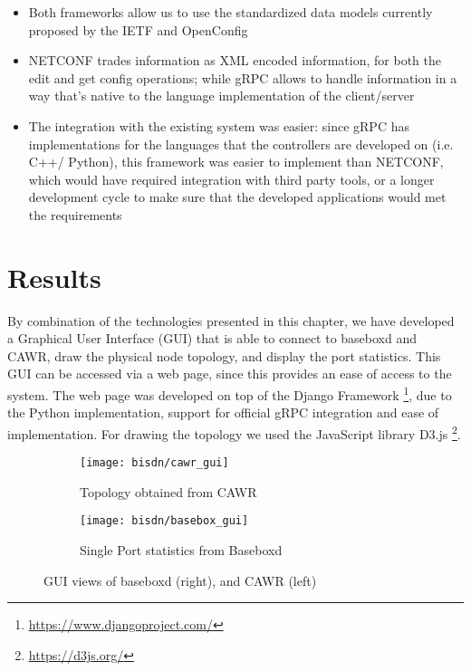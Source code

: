 \begin {itemize}
    \item Both frameworks allow us to use the standardized data models currently proposed by the IETF and OpenConfig
    \item NETCONF trades information as XML encoded information, for both the edit and get config operations; while gRPC allows to handle information in a way that’s native to the language implementation of the client/server
    \item The integration with the existing system was easier: since gRPC has implementations for the languages that the controllers are developed on (i.e. C++/ Python), this framework was easier to implement 
        than NETCONF, which would have required integration with third party tools, or a longer development cycle to make sure that the developed applications would met the requirements
\end {itemize}

\section {Results}

By combination of the technologies presented in this chapter, we have developed a Graphical User Interface (GUI) that is able to connect to baseboxd and CAWR, draw the physical node topology, and display the port statistics. 
This GUI can be accessed via a web page, since this provides an ease of access to the system. The web page was developed on top of the Django Framework \footnote{\url{https://www.djangoproject.com/}}, due to the Python implementation, support for official gRPC
integration and ease of implementation. For drawing the topology we used the JavaScript library D3.js \footnote{\url{https://d3js.org/}}.

\begin{figure} [H]
    \begin{subfigure}
        \centering
        \texttt{[image: bisdn/cawr\_gui]}
        \caption{Topology obtained from CAWR}
    \end{subfigure}
    \begin{subfigure}
        \centering
        \texttt{[image: bisdn/basebox\_gui]}
        \caption{Single Port statistics from Baseboxd}
    \end{subfigure}
    \caption{GUI views of baseboxd (right), and CAWR (left)}
\end{figure}

